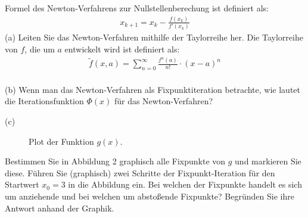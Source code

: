 \documentclass{scrartcl}
\begin{document}
	
	Formel des Newton-Verfahrens zur Nullstellenberechung ist definiert als:
	\begin{align*}
		x_{k+1} = x_k - \frac{f(x_k)}{f'(x_k)}
	\end{align*}
	(a)
	Leiten Sie das Newton-Verfahren mithilfe der Taylorreihe her. Die Taylorreihe von $f$, die um $a$ entwickelt wird ist definiert als:
	\begin{align*}
		\tilde{f}(x,a) = \sum_{n=0}^{\infty} \frac{f^n(a)}{n!} \cdot (x-a)^n
	\end{align*}
	\lbreak \lbreak \lbreak \lbreak
	\\
	(b)
	Wenn man das Newton-Verfahren als Fixpunktiteration betrachte, wie lautet die Iterationsfunktion $\Phi(x)$ für das Newton-Verfahren?
	
	\newpage
	(c)
	\begin{figure}[ht]
		\centering
		\caption{Plot der Funktion $g(x)$.}
	\end{figure}
	Bestimmen Sie in Abbildung 2 graphisch alle Fixpunkte von $g$ und markieren Sie diese.
	\n 
	Führen Sie (graphisch) zwei Schritte der Fixpunkt-Iteration für den Startwert $x_0=3$ in die Abbildung ein.
	\n 
	Bei welchen der Fixpunkte handelt es sich um anziehende und bei welchen um abstoßende Fixpunkte? Begründen Sie ihre Antwort anhand der Graphik.
\end{document}
